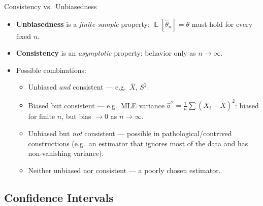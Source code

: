 \documentclass[11pt,aspectratio=169]{beamer}
\newcommand{\E}{\operatorname{\mathbb{E}}}
\newcommand{\Xbar}{\bar{X}}
\begin{document}
\begin{frame}{Consistency vs.\ Unbiasedness}
\begin{itemize}
    \item \textbf{Unbiasedness} is a \emph{finite-sample} property:
          $\E[\hat\theta_n]=\theta$ must hold for every fixed $n$.
    \item \textbf{Consistency} is an \emph{asymptotic} property: behavior
          only as $n\to\infty$.
    \item Possible combinations:
    \begin{itemize}
        \item Unbiased \emph{and} consistent — e.g.\ $\Xbar$, $S^2$.
        \item Biased but consistent — e.g.\ MLE variance
              $\hat\sigma^2=\frac1n\sum(X_i-\Xbar)^2$: biased for finite
              $n$, but bias $\to 0$ as $n\to\infty$.
        \item Unbiased but \emph{not} consistent — possible in
              pathological/contrived constructions (e.g.\ an estimator that
              ignores most of the data and has non-vanishing variance).
        \item Neither unbiased nor consistent — a poorly chosen estimator.
    \end{itemize}
\end{itemize}
\end{frame}

\subsection{Confidence Intervals}
\end{document}
